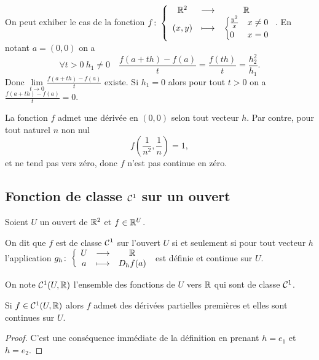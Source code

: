 On peut exhiber le cas de la fonction \(f\colon\left\{\begin{array}{ccc}\mathbb{R}^2 & \longrightarrow &\mathbb{R}\\(x,
y) & \longmapsto & 
  \begin{cases}
  \frac{y^2}{x} & x\neq 0 \\
  0 & x=0
  \end{cases}
\end{array}\right.\).
En notant \(a=(0, 0)\) on a
\begin{equation}
  \forall t>0 \ h_1\neq 0 \quad \frac{f(a+th)-f(a)}{t} = \frac{f(th)}{t} =
  \frac{h_2^2}{h_1}.
\end{equation}
Donc \(\lim\limits_{t\to 0} \frac{f(a+th)-f(a)}{t}\) existe. Si \(h_1=0\)
alors pour tout \(t>0\) on a \(\frac{f(a+th)-f(a)}{t}=0\).

La fonction \(f\) admet une dérivée en \((0, 0)\) selon tout vecteur
\(h\). Par contre, pour tout naturel \(n\) non nul
\begin{equation}
  f\left(\frac{1}{n^2}, \frac{1}{n}\right)=1,
\end{equation}
et ne tend pas vers zéro, donc \(f\) n'est pas continue en zéro.

\subsection{Fonction de classe \(\mathcal{C}^{1}\) sur un ouvert}

Soient \(U\) un ouvert de \(\mathbb{R}^2\) et \(f \in \mathbb{R}^U\).

\begin{defdef}
  On dit que \(f\) est de classe \(\mathcal{C}^{1}\) sur l'ouvert \(U\) si et
  seulement si pour tout vecteur \(h\) l'application
  \(g_h\colon\left\{\begin{array}{ccc}U & \longrightarrow &\mathbb{R}\\a & \longmapsto & D_h f(a)\end{array}\right.\) est définie et continue sur
  \(U\).

  On note \(\mathcal{C}^{1}(U, \mathbb{R})\) l'ensemble des fonctions de \(U\) vers
  \(\mathbb{R}\) qui sont de classe \(\mathcal{C}^{1}\).
\end{defdef}

\begin{prop}
  Si \(f \in \mathcal{C}^{1}(U, \mathbb{R})\) alors \(f\) admet des dérivées partielles
  premières et elles sont continues sur \(U\).
\end{prop}
\begin{proof}
  C'est une conséquence immédiate de la définition en prenant \(h=e_1\) et
  \(h=e_2\).
\end{proof}

